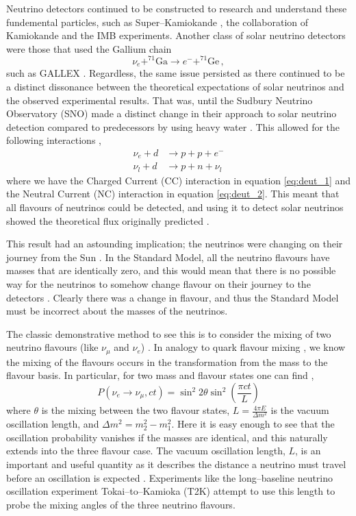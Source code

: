 Neutrino detectors continued to be constructed to research and understand these fundemental particles, such as Super--Kamiokande \cite{superk}, the collaboration of Kamiokande \cite{kam} and the IMB \cite{imb} experiments. Another class of solar neutrino detectors were those that used the Gallium chain
\begin{equation}\label{eq:gal}
  \nu_{e} + ^{71}\text{Ga} \to e^{-} + ^{71}\text{Ge}\, ,
\end{equation}
such as GALLEX \cite{gallex}. Regardless, the same issue persisted as there continued to be a distinct dissonance between the theoretical expectations of solar neutrinos and the observed experimental results. That was, until the Sudbury Neutrino Observatory (SNO) made a distinct change in their approach to solar neutrino detection compared to predecessors by using heavy water \cite{sno}. This allowed for the following interactions \cite{sno},
\begin{align}
  \nu_{e} + d & \to p + p + e^{-} \label{eq:deut_1} \\
  \nu_{l} + d & \to p + n + \nu_{l} \label{eq:deut_2}
\end{align}
where we have the Charged Current (CC) interaction in equation \ref{eq:deut_1} and the Neutral Current (NC) interaction in equation \ref{eq:deut_2}. This meant that all flavours of neutrinos could be detected, and using it to detect solar neutrinos showed the theoretical flux originally predicted \cite{sno}.

This result had an astounding implication; the neutrinos were changing on their journey from the Sun \cite{sno}. In the Standard Model, all the neutrino flavours have masses that are identically zero, and this would mean that there is no possible way for the neutrinos to somehow change flavour on their journey to the detectors \cite{solar_nu}. Clearly there was a change in flavour, and thus the Standard Model must be incorrect about the masses of the neutrinos.

The classic demonstrative method to see this is to consider the mixing of two neutrino flavours (like $\nu_{\mu}$ and $\nu_{e}$) \cite{solar_nu}. In analogy to quark flavour mixing \cite{pdg_ckm}, we know the mixing of the flavours occurs in the transformation from the mass to the flavour basis. In particular, for two mass and flavour states one can find \cite{solar_nu},
\begin{equation}
  P(\nu_{e} \to \nu_{\mu}, ct) = \sin^{2}2\theta\sin^{2}\left(\frac{\pi ct}{L}\right)
\end{equation}
where $\theta$ is the mixing between the two flavour states, $L = \frac{4\pi E}{\Delta m^{2}}$ is the vacuum oscillation length, and $\Delta m^{2} = m_{2}^{2} - m_{1}^{2}$. Here it is easy enough to see that the oscillation probability vanishes if the masses are identical, and this naturally extends into the three flavour case. The vacuum oscillation length, $L$, is an important and useful quantity as it describes the distance a neutrino must travel before an oscillation is expected \cite{solar_nu}. Experiments like the long--baseline neutrino oscillation experiment Tokai--to--Kamioka (T2K) attempt to use this length to probe the mixing angles of the three neutrino flavours. 

